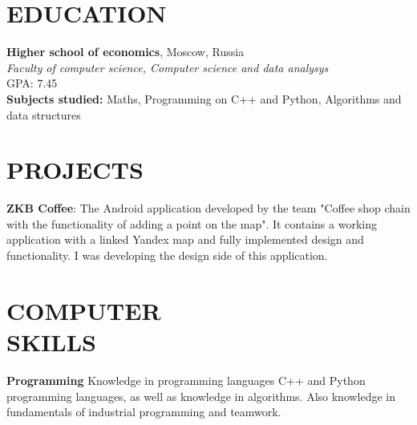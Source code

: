 \documentclass[margin]{res}
\begin{document}
\begin{resume}

\section{EDUCATION}
\textbf{Higher school of economics}, Moscow, Russia\\
{\sl Faculty of computer science, Computer science and data analysys}\\
{\hfill GPA: 
7.45\\}
\textbf{Subjects studied: } Maths, Programming on C++ and Python, Algorithms and data structures\\

\section{PROJECTS}
\par
\textbf{ZKB Coffee}: 
The Android application developed by the team "Coffee shop chain with the functionality of adding a point on the map". It contains a working application with a linked Yandex map and fully implemented design and functionality. I was developing the design side of this application.
\\


\section{COMPUTER\\SKILLS}

\textbf{Programming} 
Knowledge in programming languages C++ and Python programming languages, as well as knowledge in algorithms. Also knowledge in fundamentals of industrial programming and teamwork. 


\end{resume}
\end{document}
